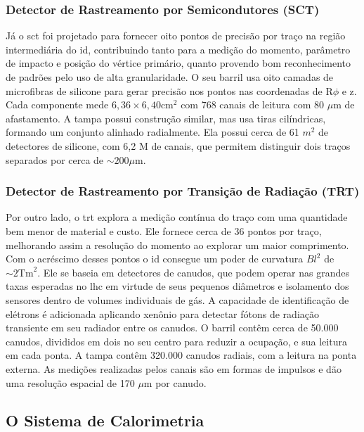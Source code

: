 \subsubsection{Detector de Rastreamento por Semicondutores (SCT)}
\label{sssec:sct}

Já o \gls{sct} foi projetado para fornecer oito pontos de precisão por traço na
região intermediária do \gls{id}, contribuindo tanto para a medição do momento,
parâmetro de impacto e posição do vértice primário, quanto provendo bom
reconhecimento de padrões pelo uso de alta granularidade. O seu barril usa oito
camadas de microfibras de silicone para gerar precisão nos pontos nas
coordenadas de R$\phi$ e z. Cada componente mede $6,36\times6,40 \text{cm}^2$ com 768 canais de
leitura com 80 $\mu$m de afastamento. A tampa possui construção similar, mas usa
tiras cilíndricas, formando um conjunto alinhado radialmente. Ela possui cerca de 61
$m^2$ de detectores de silicone, com 6,2 M de canais, que permitem distinguir
dois traços separados por cerca de $\sim200 \mu$m.

\subsubsection{Detector de Rastreamento por Transição de Radiação (TRT)}
\label{sssec:trt}

Por outro lado, o \gls{trt} explora a medição contínua do traço com uma
quantidade bem menor de material e custo. Ele fornece cerca de 36 pontos por
traço, melhorando assim a resolução do momento ao explorar um maior
\gls{comprimento}. Com o acréscimo desses pontos o \gls{id} consegue 
um poder de curvatura $Bl^2$ de $\sim2\text{Tm}^2$. 
Ele se baseia em detectores de canudos, que podem operar nas
grandes taxas esperadas no \gls{lhc} em virtude de seus pequenos diâmetros e
isolamento dos sensores dentro de volumes individuais de gás. A capacidade de
identificação de elétrons é adicionada aplicando xenônio para detectar fótons de
radiação transiente em seu radiador entre os canudos. O barril contêm cerca de
50.000 canudos, divididos em dois no seu centro para reduzir a ocupação, e sua
leitura em cada ponta. A tampa contêm 320.000 canudos radiais, com a leitura na
ponta externa. As medições realizadas pelos canais são em formas de
impulsos e dão uma resolução espacial de 170 $\mu$m por canudo.


\subsection{O Sistema de Calorimetria}
\label{ssec:calorimetria}

